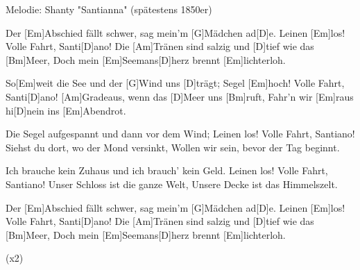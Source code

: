 Melodie: Shanty "Santianna" (spätestens 1850er)


\begin{guitar}
	Der [Em]Abschied fällt schwer, sag mein'm [G]Mädchen ad[D]e.
	Leinen [Em]los! Volle Fahrt, Santi[D]ano!
	Die [Am]Tränen sind salzig und [D]tief wie das [Bm]Meer,
	Doch mein [Em]Seemans[D]herz brennt [Em]lichterloh.
	
	So[Em]weit die See und der [G]Wind uns [D]trägt;
	Segel [Em]hoch! Volle Fahrt, Santi[D]ano!
	[Am]Gradeaus, wenn das [D]Meer uns [Bm]ruft,
	Fahr'n wir [Em]raus hi[D]nein ins [Em]Abendrot.
	
	Die Segel aufgespannt und dann vor dem Wind;
	Leinen los! Volle Fahrt, Santiano!
	Siehst du dort, wo der Mond versinkt,
	Wollen wir sein, bevor der Tag beginnt.
	
	 
	
	Ich brauche kein Zuhaus und ich brauch' kein Geld.
	Leinen los! Volle Fahrt, Santiano!
	Unser Schloss ist die ganze Welt,
	Unsere Decke ist das Himmelszelt.
	
	 
	
	Der [Em]Abschied fällt schwer, sag mein'm [G]Mädchen ad[D]e.
	Leinen [Em]los! Volle Fahrt, Santi[D]ano!
	Die [Am]Tränen sind salzig und [D]tief wie das [Bm]Meer,
	Doch mein [Em]Seemans[D]herz brennt [Em]lichterloh.
	
	  (x2)
\end{guitar}